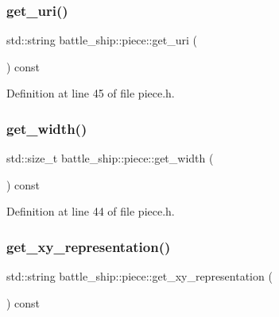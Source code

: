 \subsubsection{\texorpdfstring{get\+\_\+uri()}{get\_uri()}}
{\footnotesize\ttfamily std\+::string battle\+\_\+ship\+::piece\+::get\+\_\+uri (\begin{DoxyParamCaption}{ }\end{DoxyParamCaption}) const\hspace{0.3cm}{\ttfamily [inline]}}



Definition at line 45 of file piece.\+h.

\mbox{\label{classbattle__ship_1_1piece_a0ce4fd5c908135e60e8bed1037f1105d}} 
\subsubsection{\texorpdfstring{get\+\_\+width()}{get\_width()}}
{\footnotesize\ttfamily std\+::size\+\_\+t battle\+\_\+ship\+::piece\+::get\+\_\+width (\begin{DoxyParamCaption}{ }\end{DoxyParamCaption}) const\hspace{0.3cm}{\ttfamily [inline]}}



Definition at line 44 of file piece.\+h.

\mbox{\label{classbattle__ship_1_1piece_a4f52fbc725a70cf355832ec5cf4fd309}} 
\subsubsection{\texorpdfstring{get\+\_\+xy\+\_\+representation()}{get\_xy\_representation()}}
{\footnotesize\ttfamily std\+::string battle\+\_\+ship\+::piece\+::get\+\_\+xy\+\_\+representation (\begin{DoxyParamCaption}{ }\end{DoxyParamCaption}) const\hspace{0.3cm}{\ttfamily [inline]}}




